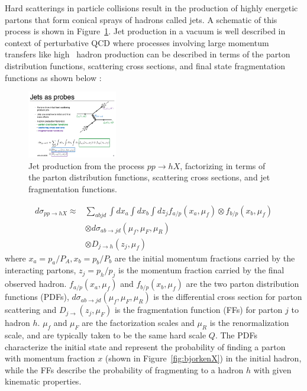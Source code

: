
Hard scatterings in particle collisions result in the production of highly energetic partons that form conical sprays of hadrons called jets. A schematic of this process is shown in Figure~\ref{fig:feynman_jet}. Jet production in a vacuum is well described in context of perturbative QCD \cite{Sjostrand:2007gs} where processes involving large momentum transfers like high \pt\ hadron production can be described in terms of the parton distribution functions, scattering cross sections, and final state fragmentation functions as shown below \cite{Qin:2015srf}:

\begin{figure}[htbp]
\begin{center}
\includegraphics[width=0.35\textwidth]{figures/theory/feynman_jet}
\caption{Jet production from the process $pp \rightarrow hX$, factorizing in terms of the parton distribution functions, scattering cross sections, and jet fragmentation functions. \cite{Qin:2015srf}}
\label{fig:feynman_jet}
\end{center}
\end{figure}

\begin{align}
\label{eq:hadronCS}
d \sigma_{pp \rightarrow hX} \approx & \sum_{abjd} \int dx_a \int dx_b \int dz_j f_{a/p} (x_a, \mu_f) \otimes f_{b/p} (x_b, \mu_f) \\
& \otimes d\sigma_{ab\rightarrow jd} (\mu_f, \mu_F, \mu_R)  \nonumber \\
& \otimes D_{j \rightarrow h} (z_j, \mu_f) \nonumber
\end{align}
where $x_a = p_a/P_A, x_b = p_b / P_b$ are the initial momentum fractions carried by the interacting partons, $z_j = p_h / p_j$ is the momentum fraction carried by the final observed hadron. $f_{a/p} (x_a, \mu_f)$ and $f_{b/p} (x_b, \mu_f)$ are the two parton distribution functions (PDFs), $d\sigma_{ab\rightarrow jd} (\mu_f, \mu_F, \mu_R)$ is the differential cross section for parton scattering and $D_{j\rightarrow }(z_j,\mu_F)$ is the fragmentation function (FFs) for parton $j$ to hadron $h$. $\mu_f$ and $\mu_F$ are the factorization scales and $\mu_R$ is the renormalization scale, and are typically taken to be the same hard scale $Q$. The PDFs characterize the initial state and represent the probability of finding a parton with momentum fraction $x$ (shown in Figure~\ref{fig:bjorkenX}) in the initial hadron, while the FFs describe the probability of fragmenting to a hadron $h$ with given kinematic properties.

